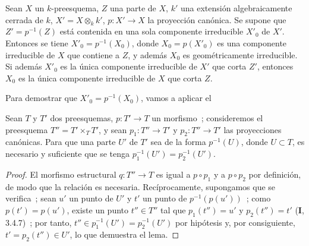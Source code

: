 \begin{proposition}[4.5.19]
Sean $X$ un $k$-preesquema, $Z$ una parte de $X$, $k'$ una extensión
algebraicamente cerrada de $k$, $X'=X\otimes_k k'$, $p:X'\to X$ la proyección
canónica. Se supone que $Z'=p^{-1}(Z)$ está contenida en \textup{una sola} componente
irreducible $X'_0$ de $X'$. Entonces se tiene $X'_0=p^{-1}(X_0)$, donde
$X_0=p(X'_0)$ es una componente irreducible de $X$ que contiene a $Z$, y además
$X_0$ es geométricamente irreducible. Si además $X'_0$ es la única componente
irreducible de $X'$ que \textup{corta} $Z'$, entonces $X_0$ es la única componente
irreducible de $X$ que corta $Z$.
\end{proposition}

Para demostrar que $X'_0=p^{-1}(X_0)$, vamos a aplicar el

\begin{lemma}[4.5.19.1]
\label{IV.2.4.5.19.1-fr}
Sean $T$ y $T'$ dos preesquemas, $p:T'\to T$ un morfismo~; consideremos el
preesquema $T''=T'\times_T T'$, y sean $p_1:T''\to T'$ y $p_2:T''\to T'$ las
proyecciones canónicas. Para que una parte $U'$ de $T'$ sea de la forma
$p^{-1}(U)$, donde $U\subset T$, es necesario y suficiente que se tenga
$p_1^{-1}(U')=p_2^{-1}(U')$.
\end{lemma}

\begin{proof}
El morfismo estructural $q:T''\to T$ es igual a $p\circ p_1$ y a
$p\circ p_2$ por definición, de modo que la relación es necesaria.
Recíprocamente, supongamos que se verifica~; sean $u'$ un punto de $U'$ y $t'$
un punto de $p^{-1}(p(u'))$~; como $p(t')=p(u')$, existe un punto $t''\in T''$
tal que $p_1(t'')=u'$ y $p_2(t'')=t'$ (\textbf I, 3.4.7)~; por tanto,
$t''\in p_1^{-1}(U')=p_2^{-1}(U')$ por hipótesis y, por consiguiente,
$t'=p_2(t'')\in U'$, lo que demuestra el lema.
\end{proof}

